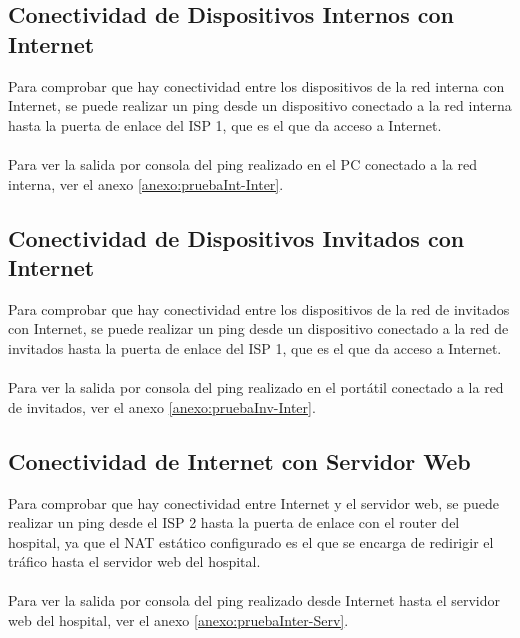 \subsection{Conectividad de Dispositivos Internos con Internet}\label{subsec:ConHaciInt}
Para comprobar que hay conectividad entre los dispositivos de la red interna con Internet, se puede realizar un ping desde un dispositivo conectado a la red interna hasta la puerta de enlace del ISP 1, 
que es el que da acceso a Internet.
\\ \\ 
Para ver la salida por consola del ping realizado en el PC conectado a la red interna, ver el anexo \ref{anexo:pruebaInt-Inter}.

\subsection{Conectividad de Dispositivos Invitados con Internet}
Para comprobar que hay conectividad entre los dispositivos de la red de invitados con Internet, se puede realizar un ping desde un dispositivo conectado a la red de invitados hasta la puerta de enlace del ISP 1, 
que es el que da acceso a Internet.
\\ \\ 
Para ver la salida por consola del ping realizado en el portátil conectado a la red de invitados, ver el anexo \ref{anexo:pruebaInv-Inter}.

\subsection{Conectividad de Internet con Servidor Web}\label{subsec:ConDesdeInt}
Para comprobar que hay conectividad entre Internet y el servidor web, se puede realizar un ping desde el ISP 2 hasta la puerta de enlace con el router del hospital, ya que el NAT estático configurado es el que se encarga de redirigir el tráfico hasta el servidor web del hospital.
\\ \\ 
Para ver la salida por consola del ping realizado desde Internet hasta el servidor web del hospital, ver el anexo \ref{anexo:pruebaInter-Serv}.

